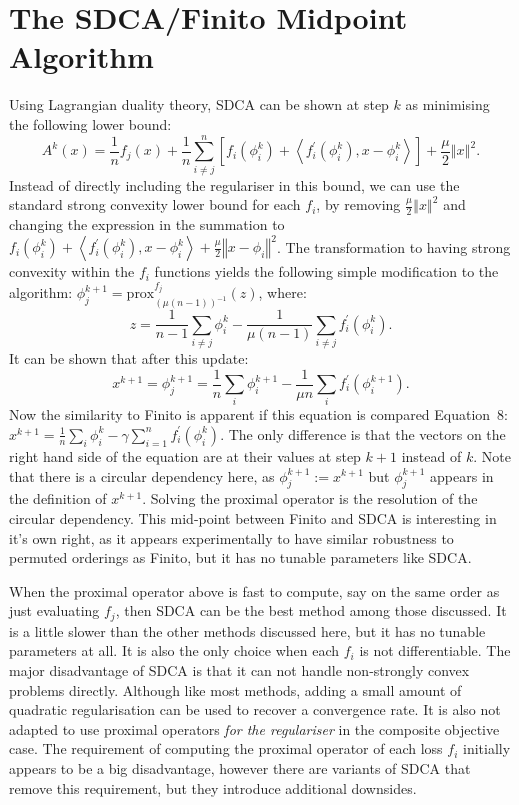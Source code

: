 \documentclass{article}
\newcommand{\stepsize}{\gamma} %
\begin{document}
\section{The SDCA/Finito Midpoint Algorithm}
Using Lagrangian duality theory, SDCA can be shown at step $k$ as minimising the following lower bound:
\[
A^{k}(x)=\frac{1}{n}f_{j}(x) +
 \frac{1}{n}\sum^{n}_{i \neq j}\left[f_{i}(\phi_{i}^{k})+\left\langle f_{i}^{\prime}(\phi_{i}^{k}),x-\phi_{i}^{k}\right\rangle \right]+\frac{\mu}{2}\left\Vert x\right\Vert ^{2}.
\]
Instead of directly including the regulariser in this bound, we can use the standard strong convexity lower bound for each $f_i$, by removing $\frac{\mu}{2}\left\Vert x\right\Vert ^{2}$ and changing the expression in the summation to 
$f_{i}(\phi_{i}^{k})+\left\langle f_{i}^{\prime}(\phi_{i}^{k}),x-\phi_{i}^{k}\right\rangle +\frac{\mu}{2}\left\Vert x-\phi_{i}\right\Vert ^{2}$.
The transformation to having strong convexity within the $f_{i}$ functions yields the following simple modification to the algorithm:
 $\phi_{j}^{k+1}=\text{prox}_{(\mu(n-1))^{-1}}^{f_{j}}(z)$, where:
\[
z=\frac{1}{n-1}\sum_{i\neq j}\phi_{i}^{k}-\frac{1}{\mu(n-1)}\sum_{i\neq j}f_{i}^{\prime}(\phi_{i}^{k}).
\]
It can be shown that after this update:
\[
	x^{k+1}=\phi_{j}^{k+1}=\frac{1}{n}\sum_{i}\phi_{i}^{k+1}-\frac{1}{\mu n}\sum_{i}f_{i}^{\prime}(\phi_{i}^{k+1}).
\]
Now the similarity to Finito is apparent if this equation is compared Equation~8: %
$x^{k+1} = \frac{1}{n}\sum_{i} \phi^{k}_{i}  - \stepsize \sum^{n}_{i=1}f_{i}^{\prime}(\phi_{i}^{k})$. The only difference is that the vectors on the right hand side of the equation are at their values at step $k+1$ instead of $k$. Note that there is a circular dependency here, as $\phi_{j}^{k+1}:=x^{k+1}$ but $\phi_{j}^{k+1}$ appears in the definition of $x^{k+1}$. Solving the proximal operator is the resolution of the circular dependency. This mid-point between Finito and SDCA is interesting in it's own right, as it appears experimentally to have similar robustness to permuted orderings as Finito, but it has no tunable parameters like SDCA.

When the proximal operator above is fast to compute, say on the same order as just evaluating $f_j$, then SDCA can be the best method among those discussed. It is a little slower than the other methods discussed here, but it has no tunable parameters at all. It is also the only choice when each $f_i$ is not differentiable. The major disadvantage of SDCA is that it can not handle non-strongly convex problems directly. Although like most methods, adding a small amount of quadratic regularisation can be used to recover a convergence rate. It is also not adapted to use proximal operators \emph{for the regulariser} in the composite objective case. The requirement of computing the proximal operator of each loss $f_i$ initially appears to be a big disadvantage, however there are variants of SDCA that remove this requirement, but they introduce additional downsides.
\end{document}
